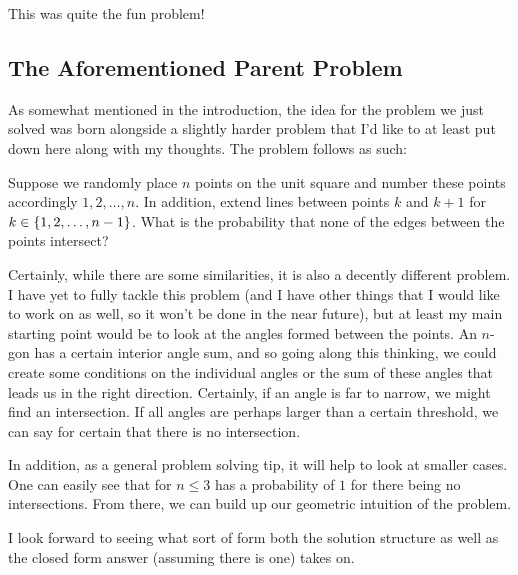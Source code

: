 This was quite the fun problem!

\subsection{The Aforementioned Parent Problem}

As somewhat mentioned in the introduction, the idea for the problem we just
solved was born alongside a slightly harder problem that I'd like to at least
put down here along with my thoughts. The problem follows as such:
\begin{blackbox}
    \begin{problem}
        Suppose we randomly place \( n \) points on the unit square and number
        these points accordingly \( 1,2,\ldots,n \). In addition, extend lines
        between points \( k \) and \( k + 1 \) for \( k \in \left\{ 1, 2, \ldots, n -
        1 \right\} \). What is the probability that none of the edges between the points
        intersect?
    \end{problem}
\end{blackbox}
Certainly, while there are some similarities, it is also a decently different
problem. I have yet to fully tackle this problem (and I have other things that
I would like to work on as well, so it won't be done in the near future), but
at least my main starting point would be to look at the angles formed between
the points. An \( n \)-gon has a certain interior angle sum, and so going along
this thinking, we could create some conditions on the individual angles or the
sum of these angles that leads us in the right direction. Certainly, if an
angle is far to narrow, we might find an intersection. If all angles are
perhaps larger than a certain threshold, we can say for certain that there is
no intersection.

In addition, as a general problem solving tip, it will help to look at smaller
cases. One can easily see that for \( n \leqslant 3 \) 
has a probability of \( 1 \) for there being no intersections. From there, we
can build up our geometric intuition of the problem.

I look forward to seeing what sort of form both the solution
structure as well as the closed form answer (assuming there is one) takes on.

